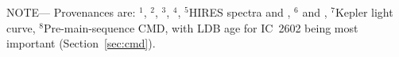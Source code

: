 \begin{table*}
\begin{flushleft}
 \footnotesize{ \textsc{NOTE}---
Provenances are:
$^1$\citet{gaia_collaboration_gaia_2018},
$^2$\citet{stassun_TIC8_2019},
$^3$\citet{skrutskie_tmass_2006},
$^4$\citet{Lindegren_2021_offset},
$^5$HIRES spectra and \citet{yee_SM_2017},
$^6$\citet{capitanio_threedimensional_2017} and \citet{lallement_threedimensional_2018},
$^7$Kepler light curve,
$^8$Pre-main-sequence CMD, with LDB age for IC~2602 being most
important (Section~\ref{sec:cmd}).
}
\end{flushleft}
\vspace{-0.5cm}
\end{table*}
